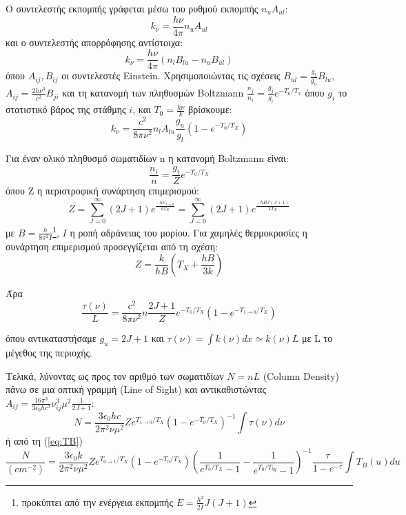 \documentclass[a4paper,12pt]{memoir}
\begin{document}
Ο συντελεστής εκπομπής γράφεται μέσω του ρυθμού εκπομπής $n_u A_{ul}$:
\begin{equation}
k_{\nu}=\frac{h \nu}{4 \pi} n_u A_{ul}
\end{equation}
και ο συντελεστής απορρόφησης αντίστοιχα:
\begin{equation}
k_{\nu}=\frac{h \nu}{4 \pi} \left( n_l B_{lu}-n_u B_{ul} \right) 
\end{equation}
όπου $A_{ij},B_{ij}$ οι συντελεστές Einstein.
Χρησιμοποιώντας τις σχέσεις $B_{ul}=\frac{g_l}{g_u} B_{lu}$, $A_{ij}=\frac{2h\nu ^3}{c^2}B_{ji}$ και τη κατανομή των πληθυσμών Boltzmann $\frac{n_j}{n_i}=\frac{g_j}{g_i} e^{-T_0/T_x}$  όπου $g_i$ το στατιστικό βάρος της στάθμης $i$, και $T_0=\frac{h\nu}{k}$ βρίσκουμε:
\begin{equation}
k_{\nu}=\frac{c^2}{8 \pi \nu ^2} n_l A_{lu} \frac{g_u}{g_l} \left(1-e^{-T_0/T_X} \right) 
\end{equation}

Για έναν ολικό πληθυσμό σωματιδίων n η κατανομή Βoltzmann είναι:
\begin{equation}
\frac{n_i}{n}=\frac{g_i}{Z}e^{-T_0/T_X}
\end{equation} 
όπου Z η περιστροφική συνάρτηση επιμερισμού:
\begin{equation}
Z=\sum\limits_{J=0}^{\infty} (2J+1)e^{\frac{-h \nu _{J\to 0}}{k T_X}} =\sum\limits_{J=0}^{\infty} (2J+1)e^{\frac{-h B J(J+1)}{k T_X}}
\end{equation}
με $B=\frac{h}{8 \pi ^2 I}$\footnote{προκύπτει από την ενέργεια εκπομπής $E=\frac{h^2}{2I} J(J+1)$}, $I$ η ροπή αδράνειας του μορίου.
\noindent
Για χαμηλές θερμοκρασίες η συνάρτηση επιμερισμού προσεγγίζεται από τη σχέση:
\begin{equation}
Z=\frac{k}{hB}\left( T_X + \frac{hB}{3k} \right) 
\end{equation}

Άρα
\begin{equation}
\frac{\tau (\nu)}{L}=\frac{c^2}{8 \pi \nu ^2} n \frac{2J+1}{Z} e^{-T_0/T_X} \left( 1-e^{-T_{1\to 0}/T_X} \right) 
\end{equation}

όπου αντικαταστήσαμε $g_u=2J+1$ και $\tau(\nu)=\int k(\nu) dx \simeq k(\nu) L$ με L το μέγεθος της περιοχής.

Τελικά, λύνοντας ως προς τον αριθμό των σωματιδίων $N=nL$ (Column Density) πάνω σε μια οπτική γραμμή (Line of Sight) και αντικαθιστώντας $A_{ij}=\frac{16 \pi ^3}{3 \epsilon _0 h c^3} \nu _{ij} ^3 \mu ^2 \frac{1}{2J+1}$:
\begin{equation}
N=\frac{3 \epsilon _0 h c}{2 \pi ^2 \nu \mu ^2 } Z e^{T_{1\to 0}/T_X} \left(1-e^{-T_0/T_X} \right) ^{-1} \int \tau (\nu) d\nu
\end{equation}
ή από τη (\ref{eq:TB})
\begin{equation}
\frac{N}{(cm^{-2})}=\frac{3 \epsilon _0 k}{2 \pi ^2 \nu \mu ^2 } Z e^{T_{0\to 1}/T_X} \left(1-e^{-T_0/T_X} \right) \left( \frac{1}{e^{T_0/T_X}-1}-\frac{1}{e^{T_0/T_{bg}}-1} \right)^{-1} \frac{\tau}{1-e^{-\tau}} \int T_B (u) du
\end{equation}
\end{document}
